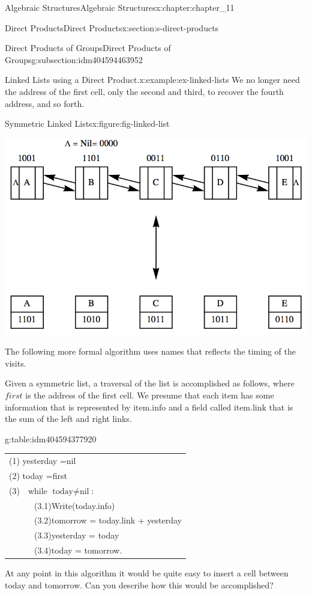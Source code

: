\documentclass[twoside,10pt,]{book}
\newcommand{\tabularfont}{\relax}
\numberwithin{equation}{section}
\begin{document}
\begin{chapterptx}{Algebraic Structures}{}{Algebraic Structures}{}{}{x:chapter:chapter_11}
\begin{sectionptx}{Direct Products}{}{Direct Products}{}{}{x:section:s-direct-products}
\begin{subsectionptx}{Direct Products of Groups}{}{Direct Products of Groups}{}{}{g:subsection:idm404594463952}
\begin{example}{Linked Lists using a Direct Product.}{x:example:ex-linked-lists}
We no longer need the address of the first cell, only the second and third, to recover the fourth address, and so forth.%
\begin{figureptx}{Symmetric Linked Lists}{x:figure:fig-linked-list}{}%
\begin{image}{0.15}{0.7}{0.15}%
\includegraphics[width=\linewidth]{images/fig-linked-list.png}
\end{image}%
\tcblower
\end{figureptx}%
The following more formal algorithm uses names that reflects the timing of the visits.%
\par
Given a symmetric list, a traversal of the list is accomplished as follows, where \(\textit{first}\) is the address of the first cell.  We presume that each item has some information that is represented by \(\textrm{item}.\textrm{info}\) and a field called item.link that is the sum of the left and right links.%
\begin{tableptx}{\textbf{}}{g:table:idm404594377920}{}%
\centering
{\tabularfont%
\begin{tabular}{l}
(1) yesterday =nil\tabularnewline[0pt]
(2) today =first\tabularnewline[0pt]
(3)\(\quad \)while \(\textrm{today} \neq  \textrm{nil}\):\tabularnewline[0pt]
\(\quad \quad \quad \)(3.1)Write(today.info)\tabularnewline[0pt]
\(\quad \quad \quad  \)(3.2)tomorrow = today.link + yesterday\tabularnewline[0pt]
\(\quad \quad \quad  \)(3.3)yesterday = today\tabularnewline[0pt]
\(\quad \quad \quad  \)(3.4)today = tomorrow.
\end{tabular}
}%
\end{tableptx}%
At any point in this algorithm it would be quite easy to insert a cell between today and tomorrow. Can you describe how this would be accomplished?%

\end{example}
\end{subsectionptx}
\end{sectionptx}
\end{chapterptx}
\end{document}
